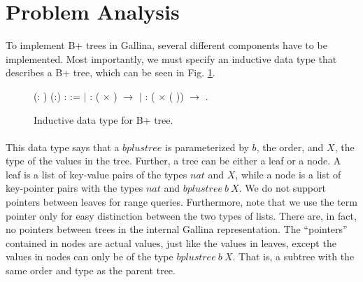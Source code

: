 \section{Problem Analysis}
\label{sec:ProblemAnalysis}
To implement B+ trees in Gallina, several different components have to be implemented. Most importantly, we must specify an inductive data type that describes a B+ tree, which can be seen in Fig. \ref{fig:inductive_data_type}.

\begin{figure}
\centering
\begin{coqdoccode}
  (: ) (:) :  :=\coqdoceol
\coqdocindent{1.00em}
\ensuremath{|}  :  ( \ensuremath{\times} ) \ensuremath{\rightarrow}   \coqdoceol
\coqdocindent{1.00em}
\ensuremath{|}  :  ( \ensuremath{\times} (  )) \ensuremath{\rightarrow}   .\coqdoceol
\end{coqdoccode}
\caption{Inductive data type for B+ tree.}
\label{fig:inductive_data_type}
\end{figure}

\paragraph{}
This data type says that a $bplustree$ is parameterized by $b$, the order, and $X$, the type of the values in the tree. Further, a tree can be either a leaf or a node. A leaf is a list of key-value pairs of the types $nat$ and $X$, while a node is a list of key-pointer pairs with the types $nat$ and $bplustree~b~X$. We do not support pointers between leaves for range queries. Furthermore, note that we use the term pointer only for easy distinction between the two types of lists. There are, in fact, no pointers between trees in the internal Gallina representation. The ``pointers'' contained in nodes are actual values, just like the values in leaves, except the values in nodes can only be of the type $bplustree~b~X$. That is, a subtree with the same order and type as the parent tree.

